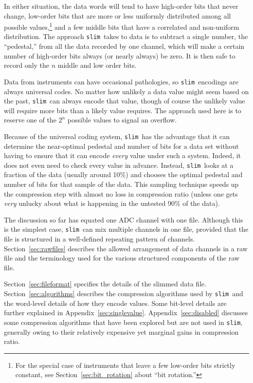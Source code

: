 \documentclass[11pt]{article}
\newcommand{\slim}{{\tt slim}}
\begin{document}
In either situation, the data words will tend to have high-order bits
that never change, low-order bits that are more or less uniformly
distributed among all possible values,\footnote{For the special case
of instruments that leave a few low-order bits strictly constant, see
Section~\ref{sec:bit_rotation} about ``bit rotation.''} and a few
middle bits that have a correlated and non-uniform distribution.  The
approach \slim\ takes to data is to subtract a single number, the
``pedestal,'' from all the data recorded by one channel, which will
make a certain number of high-order bits always (or nearly always) be
zero.  It is then safe to record only the $n$ middle and low order
bits.

Data from instruments can have occasional pathologies, so \slim\
encodings are always universal codes.  No matter how unlikely a data
value might seem based on the past, \slim\ can always encode that
value, though of course the unlikely value will require more bits than
a likely value requires.  The approach used here is to reserve one of
the $2^n$ possible values to signal an overflow.

Because of the universal coding system, \slim\ has the advantage that
it can determine the near-optimal pedestal and number of bits for a
data set without having to ensure that it can encode {\em every} value
under such a system.  Indeed, it does not even need to check every
value in advance.  Instead, \slim\ looks at a fraction of the data
(usually around 10\%) and chooses the optimal pedestal and number of
bits for that sample of the data.  This sampling technique speeds up
the compression step with almost no loss in compression ratio (unless
one gets \emph{very} unlucky about what is happening in the untested
90\% of the data).

The discussion so far has equated one ADC channel with one file.
Although this is the simplest case, \slim\ can mix multiple channels
in one file, provided that the file is structured in a well-defined
repeating pattern of channels.  Section~\ref{sec:rawfiles} describes
the allowed arrangement of data channels in a raw file and the
terminology used for the various structured components of the raw
file.

Section~\ref{sec:fileformat} specifies the details of the slimmed data
file.  Section~\ref{sec:algorithms} describes the compression
algorithms used by \slim\ and the word-level details of how they
encode values. Some bit-level details are further explained in
Appendix~\ref{sec:singlevalue}.  Appendix~\ref{sec:disabled} discusses
some compression algorithms that have been explored but are not used
in \slim, generally owing to their relatively expensive yet marginal
gains in compression ratio.
\end{document}
